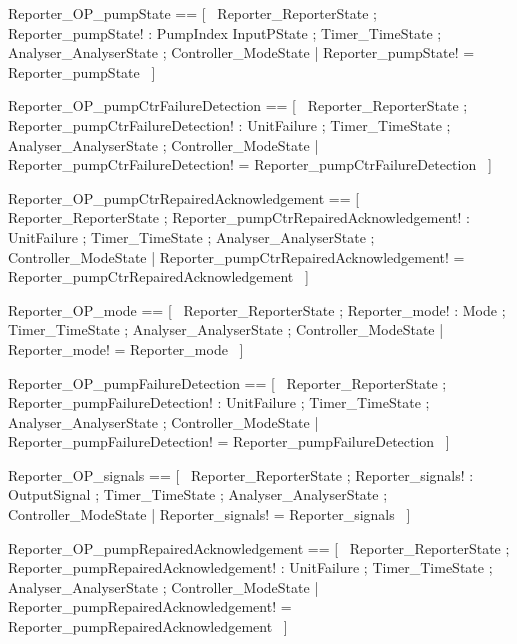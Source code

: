 \documentclass{article}
\begin{document}
\begin{zed}
	Reporter\_OP\_pumpState == [~  \Xi Reporter\_ReporterState ; Reporter\_pumpState! : PumpIndex \fun InputPState ; \Xi Timer\_TimeState ; \Xi Analyser\_AnalyserState ; \Xi Controller\_ModeState | Reporter\_pumpState! = Reporter\_pumpState  ~]
\end{zed}

\begin{zed}
	Reporter\_OP\_pumpCtrFailureDetection == [~  \Xi Reporter\_ReporterState ; Reporter\_pumpCtrFailureDetection! : \power UnitFailure ; \Xi Timer\_TimeState ; \Xi Analyser\_AnalyserState ; \Xi Controller\_ModeState | Reporter\_pumpCtrFailureDetection! = Reporter\_pumpCtrFailureDetection  ~]
\end{zed}

\begin{zed}
	Reporter\_OP\_pumpCtrRepairedAcknowledgement == [~  \Xi Reporter\_ReporterState ; Reporter\_pumpCtrRepairedAcknowledgement! : \power UnitFailure ; \Xi Timer\_TimeState ; \Xi Analyser\_AnalyserState ; \Xi Controller\_ModeState | Reporter\_pumpCtrRepairedAcknowledgement! = Reporter\_pumpCtrRepairedAcknowledgement  ~]
\end{zed}

\begin{zed}
	Reporter\_OP\_mode == [~  \Xi Reporter\_ReporterState ; Reporter\_mode! : Mode ; \Xi Timer\_TimeState ; \Xi Analyser\_AnalyserState ; \Xi Controller\_ModeState | Reporter\_mode! = Reporter\_mode  ~]
\end{zed}

\begin{zed}
	Reporter\_OP\_pumpFailureDetection == [~  \Xi Reporter\_ReporterState ; Reporter\_pumpFailureDetection! : \power UnitFailure ; \Xi Timer\_TimeState ; \Xi Analyser\_AnalyserState ; \Xi Controller\_ModeState | Reporter\_pumpFailureDetection! = Reporter\_pumpFailureDetection  ~]
\end{zed}

\begin{zed}
	Reporter\_OP\_signals == [~  \Xi Reporter\_ReporterState ; Reporter\_signals! : \power OutputSignal ; \Xi Timer\_TimeState ; \Xi Analyser\_AnalyserState ; \Xi Controller\_ModeState | Reporter\_signals! = Reporter\_signals  ~]
\end{zed}

\begin{zed}
	Reporter\_OP\_pumpRepairedAcknowledgement == [~  \Xi Reporter\_ReporterState ; Reporter\_pumpRepairedAcknowledgement! : \power UnitFailure ; \Xi Timer\_TimeState ; \Xi Analyser\_AnalyserState ; \Xi Controller\_ModeState | Reporter\_pumpRepairedAcknowledgement! = Reporter\_pumpRepairedAcknowledgement  ~]
\end{zed}
\end{document}
